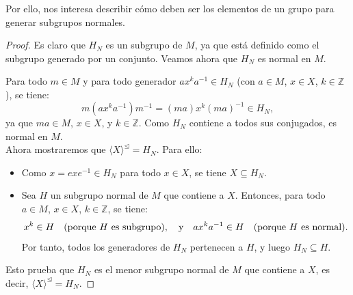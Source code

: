 \vspace{0.4cm}
Por ello, nos interesa describir cómo deben ser los elementos de un grupo para generar subgrupos normales.

\begin{definicion}
\end{definicion}

\begin{proposicion}
\end{proposicion}




\begin{proof}
	Es claro que \( H_N \) es un subgrupo de \( M \), ya que está definido como el subgrupo generado por un conjunto. Veamos ahora que \( H_N \) es normal en \( M \).
	
	\medskip	
	\noindent Para todo \( m \in M \) y para todo generador \( a x^k a^{-1} \in H_N \) (con \( a \in M \), \( x \in X \), \( k \in \mathbb{Z} \)), se tiene:
	\[
	m (a x^k a^{-1}) m^{-1} = (m a) x^k (m a)^{-1} \in H_N,
	\]
	ya que \( m a \in M \), \( x \in X \), y \( k \in \mathbb{Z} \). Como \( H_N \) contiene a todos sus conjugados, es normal en \( M \).\\
	
	\medskip 
	\noindent Ahora mostraremos que \( \langle X \rangle^{\trianglelefteq} = H_N \). Para ello:
	\begin{itemize}
		\item Como \( x = e x e^{-1} \in H_N \) para todo \( x \in X \), se tiene \( X \subseteq H_N \).
		\item Sea \( H \) un subgrupo normal de \( M \) que contiene a \( X \). Entonces, para todo \( a \in M \), \( x \in X \), \( k \in \mathbb{Z} \), se tiene:
		\[
		x^k \in H \quad \text{(porque \( H \) es subgrupo)}, \quad \text{y} \quad a x^k a^{-1} \in H \quad \text{(porque \( H \) es normal)}.
		\]
		Por tanto, todos los generadores de \( H_N \) pertenecen a \( H \), y luego \( H_N \subseteq H \).
	\end{itemize}
	Esto prueba que \( H_N \) es el menor subgrupo normal de \( M \) que contiene a \( X \), es decir, \( \langle X \rangle^{\trianglelefteq} = H_N \).
\end{proof}

